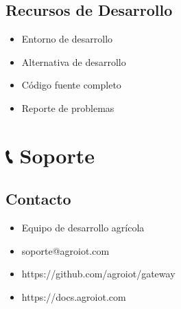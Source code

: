 \documentclass[a4paper,11pt,spanish]{sphinxmanual}
\begin{document}
\section{Recursos de Desarrollo}
\label{\detokenize{index:recursos-de-desarrollo}}\begin{itemize}
\item {} 
\sphinxAtStartPar
{} Entorno de desarrollo

\item {} 
\sphinxAtStartPar
{} Alternativa de desarrollo

\item {} 
\sphinxAtStartPar
{} Código fuente completo

\item {} 
\sphinxAtStartPar
{} Reporte de problemas

\end{itemize}


\chapter{📞 Soporte}
\label{\detokenize{index:soporte}}

\section{Contacto}
\label{\detokenize{index:contacto}}\begin{itemize}
\item {} 
\sphinxAtStartPar
{} Equipo de desarrollo agrícola

\item {} 
\sphinxAtStartPar
{} soporte@agro\sphinxhyphen{}iot.com

\item {} 
\sphinxAtStartPar
{} https://github.com/agro\sphinxhyphen{}iot/gateway

\item {} 
\sphinxAtStartPar
{} https://docs.agro\sphinxhyphen{}iot.com

\end{itemize}
\end{document}
